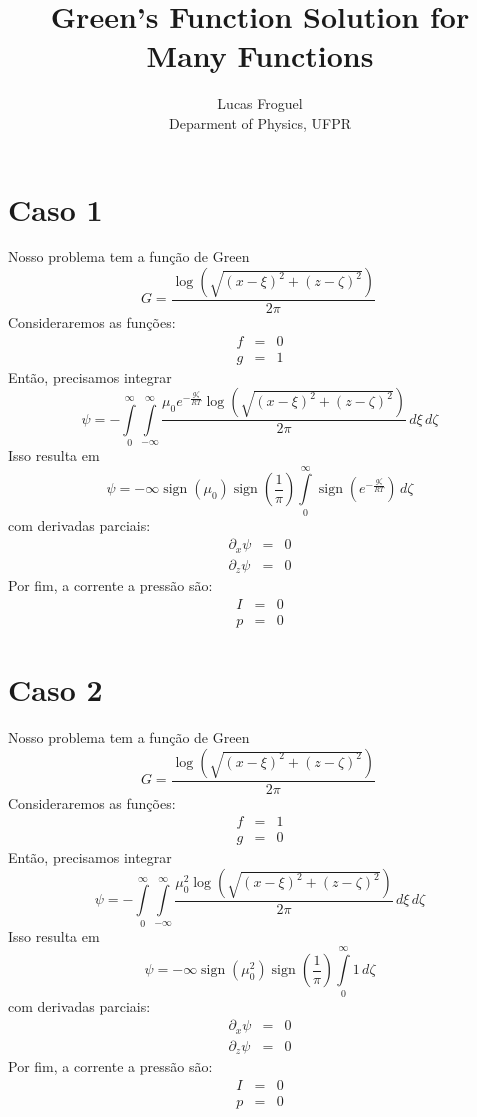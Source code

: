 \documentclass[12pt]{article}
\title{Green's Function Solution for Many Functions}
\author{Lucas Froguel\\Deparment of Physics, UFPR}
\def\be{\begin{equation}}
\def\ee{\end{equation}}
\def\bea{\begin{eqnarray*}}
\def\eea{\end{eqnarray*}}
\theoremstyle{definition}
\numberwithin{equation}{section}
\begin{document}
\maketitle



        \section{Caso 1}
        Nosso problema tem a função de Green
        \be
            G = \frac{\log{\left(\sqrt{\left(x - \xi\right)^{2} + \left(z - \zeta\right)^{2}} \right)}}{2 \pi}\
        \ee
        Consideraremos as funções:
        \bea
            f &=& 0 \\
            g &=& 1
        \eea
        Então, precisamos integrar
        \be
            \psi = - \int\limits_{0}^{\infty}\int\limits_{-\infty}^{\infty} \frac{\mu_{0} e^{- \frac{g \zeta}{R T}} \log{\left(\sqrt{\left(x - \xi\right)^{2} + \left(z - \zeta\right)^{2}} \right)}}{2 \pi}\, d\xi\, d\zeta
        \ee
        Isso resulta em
        \be
            \psi = - \infty \operatorname{sign}{\left(\mu_{0} \right)} \operatorname{sign}{\left(\frac{1}{\pi} \right)} \int\limits_{0}^{\infty} \operatorname{sign}{\left(e^{- \frac{g \zeta}{R T}} \right)}\, d\zeta
        \ee
        com derivadas parciais:
        \bea
            \partial_x\psi &=& 0 \\
            \partial_z\psi &=& 0
        \eea
        Por fim, a corrente a pressão são:
        \bea
            I &=& 0 \\
            p &=& 0
        \eea
        

        \section{Caso 2}
        Nosso problema tem a função de Green
        \be
            G = \frac{\log{\left(\sqrt{\left(x - \xi\right)^{2} + \left(z - \zeta\right)^{2}} \right)}}{2 \pi}\
        \ee
        Consideraremos as funções:
        \bea
            f &=& 1 \\
            g &=& 0
        \eea
        Então, precisamos integrar
        \be
            \psi = - \int\limits_{0}^{\infty}\int\limits_{-\infty}^{\infty} \frac{\mu_{0}^{2} \log{\left(\sqrt{\left(x - \xi\right)^{2} + \left(z - \zeta\right)^{2}} \right)}}{2 \pi}\, d\xi\, d\zeta
        \ee
        Isso resulta em
        \be
            \psi = - \infty \operatorname{sign}{\left(\mu_{0}^{2} \right)} \operatorname{sign}{\left(\frac{1}{\pi} \right)} \int\limits_{0}^{\infty} 1\, d\zeta
        \ee
        com derivadas parciais:
        \bea
            \partial_x\psi &=& 0 \\
            \partial_z\psi &=& 0
        \eea
        Por fim, a corrente a pressão são:
        \bea
            I &=& 0 \\
            p &=& 0
        \eea
        
\end{document}
